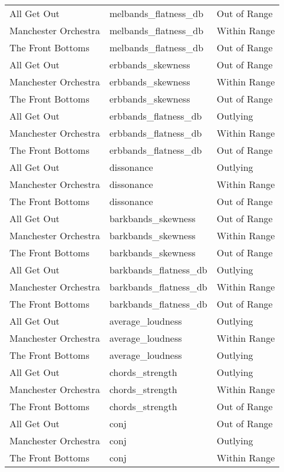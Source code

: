 \documentclass{article}\usepackage[]{graphicx}\usepackage[]{xcolor}
\begin{document}
\begin{table}[ht]
\begin{tabular}{lll}
  All Get Out & melbands\_flatness\_db & Out of Range \\ 
  Manchester Orchestra & melbands\_flatness\_db & Within Range \\ 
  The Front Bottoms & melbands\_flatness\_db & Out of Range \\ 
  All Get Out & erbbands\_skewness & Out of Range \\ 
  Manchester Orchestra & erbbands\_skewness & Within Range \\ 
  The Front Bottoms & erbbands\_skewness & Out of Range \\ 
  All Get Out & erbbands\_flatness\_db & Outlying \\ 
  Manchester Orchestra & erbbands\_flatness\_db & Within Range \\ 
  The Front Bottoms & erbbands\_flatness\_db & Out of Range \\ 
  All Get Out & dissonance & Outlying \\ 
  Manchester Orchestra & dissonance & Within Range \\ 
  The Front Bottoms & dissonance & Out of Range \\ 
  All Get Out & barkbands\_skewness & Out of Range \\ 
  Manchester Orchestra & barkbands\_skewness & Within Range \\ 
  The Front Bottoms & barkbands\_skewness & Out of Range \\ 
  All Get Out & barkbands\_flatness\_db & Outlying \\ 
  Manchester Orchestra & barkbands\_flatness\_db & Within Range \\ 
  The Front Bottoms & barkbands\_flatness\_db & Out of Range \\ 
  All Get Out & average\_loudness & Outlying \\ 
  Manchester Orchestra & average\_loudness & Within Range \\ 
  The Front Bottoms & average\_loudness & Outlying \\ 
  All Get Out & chords\_strength & Outlying \\ 
  Manchester Orchestra & chords\_strength & Within Range \\ 
  The Front Bottoms & chords\_strength & Out of Range \\ 
  All Get Out & conj & Out of Range \\ 
  Manchester Orchestra & conj & Outlying \\ 
  The Front Bottoms & conj & Within Range \\ 

\end{tabular}
\end{table}
\end{document}

